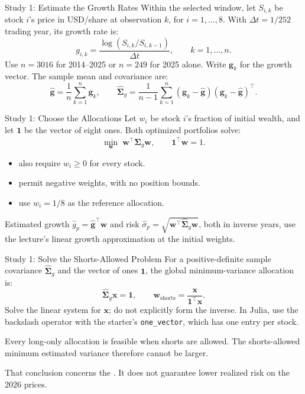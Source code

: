 \documentclass[aspectratio=169,11pt]{beamer}
\newcommand{\bw}{\mathbf{w}}
\newcommand{\bone}{\mathbf{1}}
\newcommand{\Sg}{\widehat{\boldsymbol{\Sigma}}_g}
\newcommand{\ghat}{\widehat{\mathbf{g}}}
\begin{document}
\begin{frame}{Study 1: Estimate the Growth Rates}
Within the selected window, let $S_{i,k}$ be stock $i$'s price in USD/share
at observation $k$, for $i=1,\ldots,8$. With $\Delta t=1/252$ trading year, its growth rate is:
\[
 g_{i,k}=\frac{\log(S_{i,k}/S_{i,k-1})}{\Delta t},
 \qquad k=1,\ldots,n.
\]
Use $n=3016$ for 2014--2025 or $n=249$ for 2025 alone. Write
$\mathbf g_k$ for the growth vector. The sample mean and covariance are:
\[
 \ghat=\frac1n\sum_{k=1}^n\mathbf g_k,
 \qquad
 \Sg=\frac1{n-1}\sum_{k=1}^n
 (\mathbf g_k-\ghat)(\mathbf g_k-\ghat)^\top.
\]
\end{frame}

\begin{frame}{Study 1: Choose the Allocations}
Let $w_i$ be stock $i$'s fraction of initial wealth, and let $\bone$ be the
vector of eight ones. Both optimized portfolios solve:
\[
 \min_{\bw}\;\bw^\top\Sg\bw,
 \qquad \bone^\top\bw=1.
\]
\begin{itemize}\setlength{\itemsep}{0.5em}
\item {} also require $w_i\geq0$ for every stock.
\item {} permit negative weights, with no position bounds.
\item {} use $w_i=1/8$ as the reference allocation.
\end{itemize}
\vspace{0.2em}
Estimated growth $\hat g_p=\ghat^\top\bw$ and risk $\widehat\sigma_p=\sqrt{\bw^\top\Sg\bw}$,
both in inverse years, use the lecture's linear growth approximation at the
initial weights.
\end{frame}

\begin{frame}{Study 1: Solve the Shorts-Allowed Problem}
For a positive-definite sample covariance $\Sg$ and the vector of ones
$\bone$, the global minimum-variance allocation is:
\[
 \Sg\mathbf x=\bone,
 \qquad
 \bw_{\mathrm{shorts}}=\frac{\mathbf x}{\bone^\top\mathbf x}.
\]
Solve the linear system for $\mathbf x$; do not explicitly form the inverse.
In Julia, use the backslash operator with the starter's \texttt{one\_vector},
which has one entry per stock.

\vspace{0.8em}
Every long-only allocation is feasible when shorts are allowed. The
shorts-allowed minimum estimated variance therefore cannot be larger.

\vspace{0.8em}
That conclusion concerns the . It does
not guarantee lower realized risk on the 2026 prices.
\end{frame}
\end{document}
